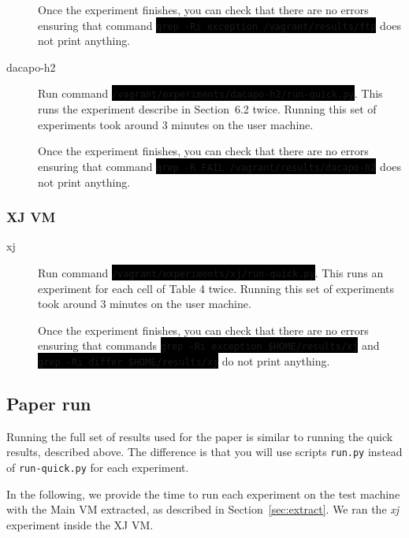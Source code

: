 \documentclass[12pt]{article}
\newcommand{\command}[1]{\colorbox{black}{\texttt{\color{white}#1}}}
\begin{document}
\begin{description}
        Once the experiment finishes, you can check that there are no errors
        ensuring that command \command{grep -Ri exception /vagrant/results/ftp}
        does not print anything.

    \item[dacapo-h2] Run command
        \command{/vagrant/experiments/dacapo-h2/run-quick.py}.  This runs the
        experiment describe in Section~6.2 twice.  Running this set of
        experiments took around 3 minutes on the user machine.

        Once the experiment finishes, you can check that there are no errors
        ensuring that command \command{grep -R FAIL /vagrant/results/dacapo-h2}
        does not print anything.

\end{description}

\subsubsection{XJ VM}

\begin{description}

    \item[xj] Run command \command{/vagrant/experiments/xj/run-quick.py}.  This
        runs an experiment for each cell of Table 4 twice.  Running this set of
        experiments took around 3 minutes on the user machine.

        Once the experiment finishes, you can check that there are no errors
        ensuring that commands \command{grep -Ri exception \$HOME/results/xj} and
        \command{grep -Ri differ \$HOME/results/xj} do not print anything.

\end{description}

\subsection{Paper run}
\label{sec:paper-run}

Running the full set of results used for the paper is similar to running the
quick results, described above.  The difference is that you will use scripts
\texttt{run.py} instead of \texttt{run-quick.py} for each experiment.

In the following, we provide the time to run each experiment on the
test machine with the Main VM extracted, as described in
Section~\ref{sec:extract}.  We ran the \emph{xj} experiment inside the XJ VM.
\end{document}
